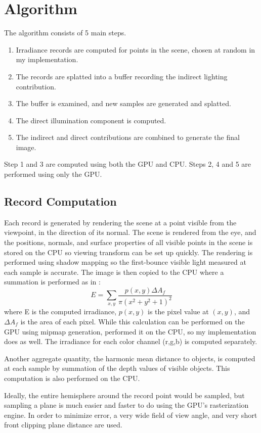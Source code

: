 \documentclass[10pt,twopage]{acmsiggraph}
\begin{document}
\section{Algorithm}
The algorithm consists of 5 main steps.  
\begin{enumerate}
\item Irradiance records are computed for points in the scene, chosen at random in my implementation.  
\item The records are splatted into a buffer recording the indirect lighting contribution.  
\item The buffer is examined, and new samples are generated and splatted.  
\item The direct illumination component is computed.  
\item The indirect and direct contributions are combined to generate the final image.  
\end{enumerate}

Step 1 and 3 are computed using both the GPU and CPU.  Steps 2, 4 and 5 are performed using only the GPU.

\subsection{Record Computation}
Each record is generated by rendering the scene at a point visible from the viewpoint, in the direction of its normal.  The scene is rendered from the eye, and the positions, normals, and surface properties of all visible points in the scene is stored on the CPU so viewing transform can be set up quickly.  The rendering is performed using shadow mapping so the first-bounce visible light measured at each sample is accurate.  The image is then copied to the CPU where a summation is performed as in \cite{larsen2004simulating}: 
$$
E = \sum_{x,y}\frac{p(x,y)\Delta A_f}{\pi(x^2 + y^2 +1)^2}
$$
where E is the computed irradiance, $p(x,y)$ is the pixel value at $(x,y)$,  and $\Delta A_f$ is the area of each pixel.  While this calculation can be performed on the GPU using mipmap generation, \cite{mainpaper} performed it on the CPU, so my implementation does as well.  The irradiance for each color channel (r,g,b) is computed separately.

Another aggregate quantity, the harmonic mean distance to objects, is computed at each sample by summation of the depth values of visible objects.  This computation is also performed on the CPU.

Ideally, the entire hemisphere around the record point would be sampled, but sampling a plane is much easier and faster to do using the GPU's rasterization engine.  In order to minimize error, a very wide field of view angle, and very short front clipping plane distance are used.    
\end{document}
